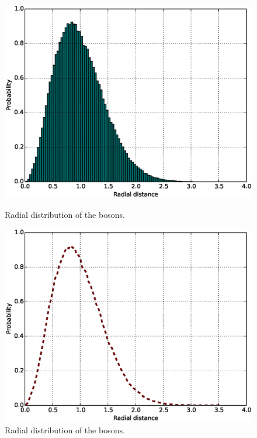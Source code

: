 \documentclass[english, a4paper]{article}
\begin{document}
\begin{figure}[H]
	\begin{minipage}[t]{0.48\linewidth}
		\includegraphics[width=\textwidth]{../modifiedMortenCode/figures/radialdistributionIe6.eps}
		\caption{Radial distribution of the bosons.}
		\label{fig:onebodyDensityInteractinghist}
	\end{minipage}
	\quad
	\begin{minipage}[t]{0.48\linewidth}
		\includegraphics[width=\textwidth]{../modifiedMortenCode/figures/radialdistributionIe6curve.eps}
		\caption{Radial distribution of the bosons.}
		\label{fig:onebodyDensityInteracting}
	\end{minipage}
\end{figure}
\end{document}
